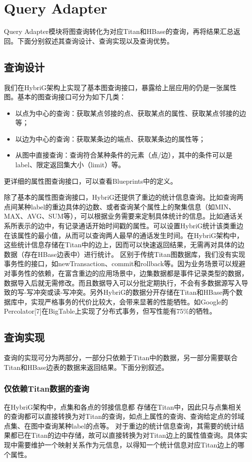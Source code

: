 
\chapter{Query Adapter}
Query Adapter模块将图查询转化为对应Titan和HBase的查询，再将结果汇总返回。下面分别叙述其查询设计、查询实现以及查询优势。
\section{查询设计}
我们在HybriG架构上实现了基本图查询接口，暴露给上层应用的仍是一张属性图。基本的图查询接口可分为如下几类：
\begin{itemize}
	\item 以点为中心的查询：获取某点邻接的点、获取某点的属性、获取某点邻接的边等；
	\item 以边为中心的查询：获取某条边的端点、获取某条边的属性等；
	\item 从图中直接查询：查询符合某种条件的元素（点/边），其中的条件可以是label、限定返回集大小（limit）等。
\end{itemize}
更详细的属性图查询接口，可以查看Blueprints中的定义。

除了基本的属性图查询接口，HybriG还提供了重边的统计信息查询。比如查询两点间某种label的重边具体的边数、或者查询某个属性上的聚集信息（如MIN、MAX、AVG、SUM等），可以根据业务需要来定制具体统计的信息。比如通话关系所表示的边中，有记录通话开始时间戳的属性。可以设置HybriG统计该类重边在该属性的最小值，从而可以查询两人最早的通话发生时间。在HybriG架构中，这些统计信息存储在Titan中的边上，因而可以快速返回结果，无需再对具体的边数据（存在HBase边表中）进行统计。
区别于传统Titan图数据库，我们没有实现事务性的接口，如newTransaction、commit和rollback等。因为业务场景可以规避对事务性的依赖，在富含重边的应用场景中，边集数据都是事件记录类型的数据，数据导入后就无需修改。而且数据导入可以分批定期执行，不会有多数据源写入导致的写-写冲突或读-写冲突。另外HybriG的数据分开存储在Titan和HBase两个数据库中，实现严格事务的代价比较大，会带来显著的性能牺牲。如Google的Percolator[7]在BigTable上实现了分布式事务，但写性能有75\%的牺牲。

\section{查询实现}
查询的实现可分为两部分，一部分只依赖于Titan中的数据，另一部分需要联合Titan和HBase边表的数据来返回结果。下面分别叙述。
\subsection{仅依赖Titan数据的查询}
在HybriG架构中，点集和各点的邻接信息都
存储在Titan中，因此只与点集相关的查询都可以直接转换为对Titan的查询，如点上属性的查询、查询给定点的邻域点集、在图中查询某种label的点等。
对于重边的统计信息查询，其需要的统计结果都已在Titan的边中存储，故可以直接转换为对Titan边上的属性值查询。具体实现中需要维护一个映射关系作为元信息，以得知一个统计信息对应Titan边上的哪个属性。
